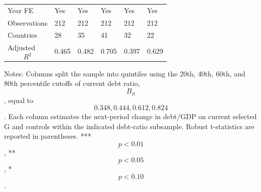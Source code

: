 \begin{table}[H]
\begin{threeparttable}
\begin{tabularx}{\textwidth}{lYYYYY}
Year FE & Yes & Yes & Yes & Yes & Yes \\
Observations & 212 & 212 & 212 & 212 & 212 \\
Countries & 28 & 35 & 41 & 32 & 22 \\
Adjusted $$R^2$$ & 0.465 & 0.482 & 0.705 & 0.397 & 0.629 \\
\bottomrule
\end{tabularx}
\begin{tablenotes}[flushleft]\footnotesize
\item Notes: Columns split the sample into quintiles using the 20th, 40th, 60th, and 80th percentile cutoffs of current debt ratio, $$B_{it}$$, equal to $$0.348, 0.444, 0.612, 0.824$$. Each column estimates the next-period change in debt/GDP on current selected G and controls within the indicated debt-ratio subsample. Robust t-statistics are reported in parentheses. *** $$p<0.01$$, ** $$p<0.05$$, * $$p<0.10$$.
\end{tablenotes}
\end{threeparttable}
\end{table}
